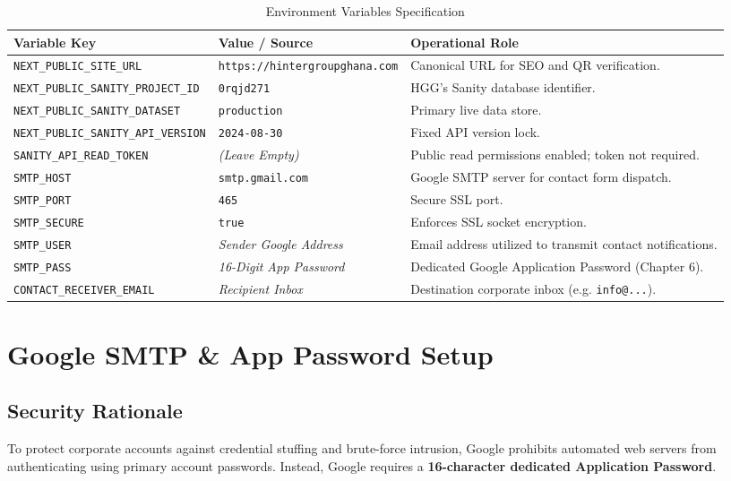 \documentclass[11pt,a4paper,oneside]{book}
\begin{document}
\begin{table}[H]
\centering
\footnotesize
\renewcommand{\arraystretch}{1.08}
\begin{tabularx}{\textwidth}{lXX}
  \toprule
  \textbf{Variable Key} & \textbf{Value / Source} & \textbf{Operational Role} \\
  \midrule
  \texttt{NEXT\_PUBLIC\_SITE\_URL} & \texttt{https://hintergroupghana.com} & Canonical URL for SEO and QR verification. \\
  \texttt{NEXT\_PUBLIC\_SANITY\_PROJECT\_ID} & \texttt{0rqjd271} & HGG's Sanity database identifier. \\
  \texttt{NEXT\_PUBLIC\_SANITY\_DATASET} & \texttt{production} & Primary live data store. \\
  \texttt{NEXT\_PUBLIC\_SANITY\_API\_VERSION} & \texttt{2024-08-30} & Fixed API version lock. \\
  \texttt{SANITY\_API\_READ\_TOKEN} & \textit{(Leave Empty)} & Public read permissions enabled; token not required. \\
  \texttt{SMTP\_HOST} & \texttt{smtp.gmail.com} & Google SMTP server for contact form dispatch. \\
  \texttt{SMTP\_PORT} & \texttt{465} & Secure SSL port. \\
  \texttt{SMTP\_SECURE} & \texttt{true} & Enforces SSL socket encryption. \\
  \texttt{SMTP\_USER} & \textit{Sender Google Address} & Email address utilized to transmit contact notifications. \\
  \texttt{SMTP\_PASS} & \textit{16-Digit App Password} & Dedicated Google Application Password (Chapter 6). \\
  \texttt{CONTACT\_RECEIVER\_EMAIL} & \textit{Recipient Inbox} & Destination corporate inbox (e.g. \texttt{info@...}). \\
  \bottomrule
\end{tabularx}
\caption{Environment Variables Specification}
\label{tab:env-vars}
\end{table}

\chapter{Google SMTP \& App Password Setup}

\section{Security Rationale}
To protect corporate accounts against credential stuffing and brute-force intrusion, Google prohibits automated web servers from authenticating using primary account passwords. Instead, Google requires a \textbf{16-character dedicated Application Password}.
\end{document}
